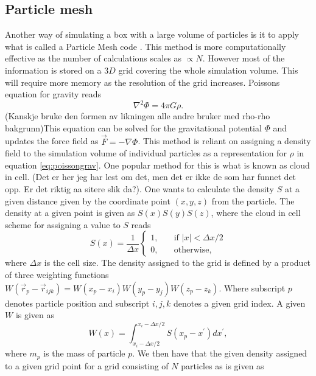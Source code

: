 \subsection{Particle mesh}
Another way of simulating a box with a large volume of particles is it to apply
what is called a Particle Mesh code \cite{HockneyRW1981Csup} \cite{Fazio2309855}. This method is more computationally
effective as the number of calculations scales as $\propto N$. However most of
the information is stored on a $3D$ grid covering the whole simulation volume.
This will require more memory as the resolution of the grid increases. Poissons equation for gravity reads
\begin{equation}\label{eq:poissongrav}
    \nabla^2\Phi=4\pi G\rho.
\end{equation}
(Kanskje bruke den formen av likningen alle andre bruker med rho-rho bakgrunn)This equation can be solved for the gravitational potential $\Phi$ and updates
the force field as $\vec{F}=-\nabla\Phi$. This method is reliant on assigning a
density field to the simulation volume of individual particles as a
representation for $\rho$ in equation \ref{eq:poissongrav}. One popular method 
for this is what is known as cloud in cell. (Det
er her jeg har lest om det, men det er ikke de som har funnet det opp. Er det
riktig aa sitere slik da?). One wants to calculate the density $S$ at a given
distance given by the coordinate point $(x, y, z)$ from the particle. The density at a given point is given as
$S(x)S(y)S(z)$, where the cloud in cell scheme for assigning a value to $S$
reads
\begin{equation}
    S(x)=\frac{1}{\Delta x}
    \begin{cases}
        1, &\quad\text{if }\vert x \vert < \Delta x/2\\
        0, &\quad\text{otherwise},
      \end{cases}
\end{equation}
where $\Delta x$ is the cell size. The density assigned to the grid is defined
by a product of three weighting functions $W(\vec{r}_p -\vec{r}_{ijk}) =
W(x_p-x_i)W(y_p-y_j)W(z_p-z_k)$. Where subscript $p$ denotes particle position
and subscript $i,j,k$ denotes a given grid index. A given $W$ is given as
\begin{equation}
    W(x)=\int_{x_i-\Delta x/2}^{x_i-\Delta x/2} S(x_p - x^\prime)dx^\prime,
\end{equation}
where $m_p$ is the mass of particle $p$. We then have that the given density assigned to a given grid point for a grid
consisting of $N$ particles as is given as

